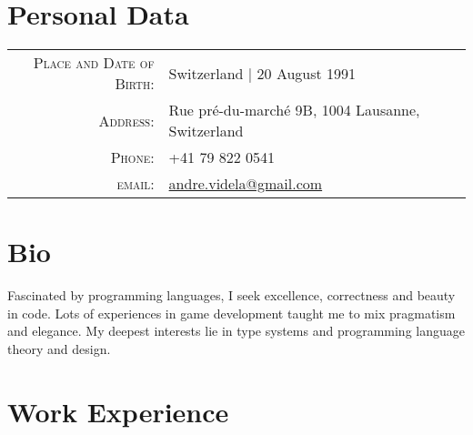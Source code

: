 \documentclass[a4paper,10pt]{article} %
\begin{document}
\pagestyle{empty} %


\par{\bigskip\par} %

\section{Personal Data}

\begin{tabular}{rl}
\textsc{Place and Date of Birth:} & Switzerland  | 20 August 1991 \\
\textsc{Address:} & Rue pré-du-marché 9B, 1004 Lausanne, Switzerland \\
\textsc{Phone:} & +41 79 822 0541\\
\textsc{email:} & \href{mailto:andre.videla@gmail.com}{andre.videla@gmail.com}
\end{tabular}


\section{Bio}
Fascinated by programming languages, I seek excellence, correctness and beauty in code. Lots of experiences in game development taught me to mix pragmatism and elegance. My deepest interests lie in type systems and programming language theory and design.


\section{Work Experience}
\end{document}
